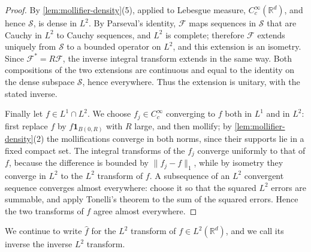 \begin{proof}
By \cref{lem:mollifier-density}(5), applied to Lebesgue measure, $C_c^\infty(\mathbb R^d)$, and hence $\mathcal S$, is dense in $L^2$. By Parseval's identity, $\mathcal F$ maps sequences in $\mathcal S$ that are Cauchy in $L^2$ to Cauchy sequences, and $L^2$ is complete; therefore $\mathcal F$ extends uniquely from $\mathcal S$ to a bounded operator on $L^2$, and this extension is an isometry. Since $\mathcal F^*=R\mathcal F$, the inverse integral transform extends in the same way. Both compositions of the two extensions are continuous and equal to the identity on the dense subspace $\mathcal S$, hence everywhere. Thus the extension is unitary, with the stated inverse.

Finally let $f\in L^1\cap L^2$. We choose $f_j\in C_c^\infty$ converging to $f$ both in $L^1$ and in $L^2$: first replace $f$ by $f\mathbf1_{B(0,R)}$ with $R$ large, and then mollify; by \cref{lem:mollifier-density}(2) the mollifications converge in both norms, since their supports lie in a fixed compact set. The integral transforms of the $f_j$ converge uniformly to that of $f$, because the difference is bounded by $\|f_j-f\|_1$, while by isometry they converge in $L^2$ to the $L^2$ transform of $f$. A subsequence of an $L^2$ convergent sequence converges almost everywhere: choose it so that the squared $L^2$ errors are summable, and apply Tonelli's theorem to the sum of the squared errors. Hence the two transforms of $f$ agree almost everywhere.
\end{proof}

We continue to write $\widehat f$ for the $L^2$ transform of $f\in L^2(\mathbb R^d)$, and we call its inverse the inverse $L^2$ transform.

